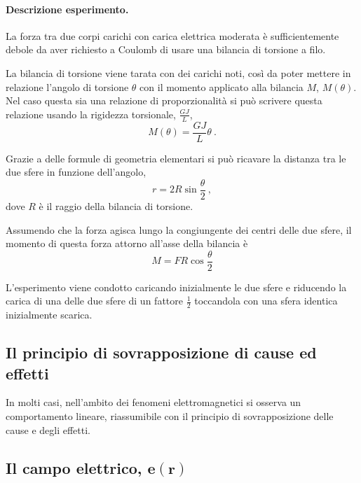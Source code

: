 \paragraph{Descrizione esperimento.} La forza tra due corpi carichi con carica elettrica moderata è sufficientemente debole da aver richiesto a Coulomb di usare una bilancia di torsione a filo.

\noindent
La bilancia di torsione viene tarata con dei carichi noti, così da poter mettere in relazione l'angolo di torsione $\theta$ con il momento applicato alla bilancia $M$, $M(\theta)$. Nel caso questa sia una relazione di proporzionalità si può scrivere questa relazione usando la rigidezza torsionale, $\frac{GJ}{L}$,
\begin{equation}
    M(\theta) = \dfrac{GJ}{L} \theta \ .
\end{equation}

\noindent
Grazie a delle formule di geometria elementari si può ricavare la distanza tra le due sfere in funzione dell'angolo,
\begin{equation}
    r = 2 R \sin \frac{\theta}{2} \ ,
\end{equation}
dove $R$ è il raggio della bilancia di torsione.

\noindent
Assumendo che la forza agisca lungo la congiungente dei centri delle due sfere, il momento di questa forza attorno all'asse della bilancia è
\begin{equation}
    M = F R \cos \frac{\theta}{2}
\end{equation}

\noindent
L'esperimento viene condotto caricando inizialmente le due sfere e riducendo la carica di una delle due sfere di un fattore $\frac{1}{2}$ toccandola con una sfera identica inizialmente scarica.

\subsection{Il principio di sovrapposizione di cause ed effetti}
In molti casi, nell'ambito dei fenomeni elettromagnetici si osserva un comportamento lineare, riassumibile con il principio di sovrapposizione delle cause e degli effetti.

\subsection{Il campo elettrico, $\mathbf{e}(\mathbf{r})$}
